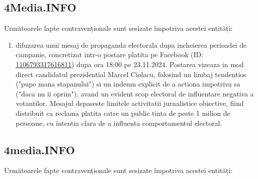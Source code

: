 \documentclass[a4paper,12pt]{article}
\begin{document}
\vspace{0.5cm}

\subsection{4Media.INFO}
Următoarele fapte contravenționale sunt sesizate împotriva acestei entități:

\begin{enumerate}[leftmargin=*, label=\arabic*.)]
    \item difuzarea unui mesaj de propaganda electorala dupa incheierea perioadei de campanie, concretizat intr-o postare platita pe Facebook (ID: \href{https://www.facebook.com/ads/library/?id=1106793317616811}{1106793317616811}) dupa ora 18:00 pe 23.11.2024. Postarea vizeaza in mod direct candidatul prezidential Marcel Ciolacu, folosind un limbaj tendentios ("pupe mana stapanului") si un indemn explicit de a actiona impotriva sa ("daca nu ii oprim"), avand un evident scop electoral de influentare negativa a votantilor. Mesajul depaseste limitele activitatii jurnalistice obiective, fiind distribuit ca reclama platita catre un public tinta de peste 1 milion de persoane, cu intentia clara de a influenta comportamentul electoral.
\end{enumerate}

\vspace{0.5cm}

\subsection{4media.INFO}
Următoarele fapte contravenționale sunt sesizate împotriva acestei entități:
\end{document}
